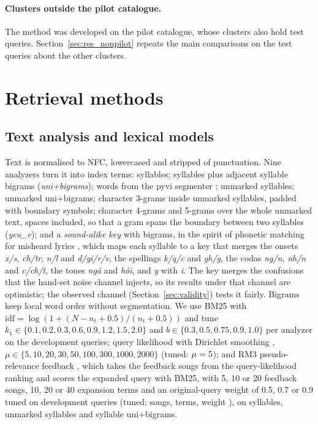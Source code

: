 \documentclass[11pt]{article}
\newcommand{\vi}[1]{\textit{#1}}          %
\begin{document}
\paragraph{Clusters outside the pilot catalogue.} The method was developed on the pilot catalogue, whose
clusters also hold test queries. Section~\ref{sec:res_nonpilot} repeats the main comparisons on the test
queries about the other clusters.



\section{Retrieval methods}\label{sec:methods}

\subsection{Text analysis and lexical models}\label{sec:lexical}
Text is normalised to NFC, lowercased and stripped of punctuation. Nine analyzers turn it into index terms:
syllables; syllables plus adjacent syllable bigrams (\emph{uni+bigrams}); words from the pyvi segmenter
\citep{pyvi}; unmarked syllables; unmarked uni+bigrams; character 3-grams inside unmarked syllables, padded with
boundary symbols; character 4-grams and 5-grams over the whole unmarked text, spaces included, so that a gram
spans the boundary between two syllables (\vi{yeu\_e}); and a \emph{sound-alike key} with bigrams, in the spirit
of phonetic matching for misheard lyrics \citep{xu2009lyric}, which maps each syllable to a key that merges the
onsets \vi{x/s}, \vi{ch/tr}, \vi{n/l} and \vi{d/gi/r/v}, the spellings \vi{k/q/c} and \vi{gh/g}, the codas
\vi{ng/n}, \vi{nh/n} and \vi{c/ch/t}, the tones \vi{ngã} and \vi{hỏi}, and \vi{y} with \vi{i}. The key merges the
confusions that the hand-set noise channel injects, so its results under that channel are optimistic; the
observed channel (Section~\ref{sec:validity}) tests it fairly. Bigrams keep local word order without
segmentation. We use BM25 \citep{robertson2009bm25} with $\mathrm{idf} = \log(1 + (N - n_t + 0.5)/(n_t + 0.5))$
and tune $k_1 \in \{0.1, 0.2, 0.3, 0.6, 0.9, 1.2, 1.5, 2.0\}$ and $b \in \{0.3, 0.5, 0.75, 0.9, 1.0\}$ per analyzer
on the development queries; query likelihood with Dirichlet smoothing \citep{zhai2001smoothing},
$\mu \in \{5, 10, 20, 30, 50, 100, 300, 1000, 2000\}$ (tuned: $\mu = 5$); and RM3 pseudo-relevance feedback
\citep{lavrenko2001relevance,abduljaleel2004umass}, which takes the feedback songs from the query-likelihood
ranking and scores the expanded query with BM25, with 5, 10 or 20 feedback songs, 10, 20 or 40 expansion terms and an
original-query weight of 0.5, 0.7 or 0.9 tuned on development queries (tuned:
\RMthreeDocs{} songs, \RMthreeTerms{} terms, weight \RMthreeOrigW), on syllables, unmarked syllables and
syllable uni+bigrams.
\end{document}
